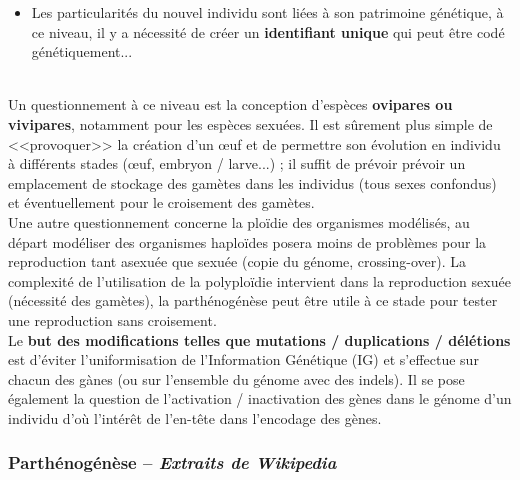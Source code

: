 \documentclass[11pt,twoside,a4paper]{article}
\begin{document}
\begin{itemize}
\begin{itemize}
		\end{itemize}
		Le croisement des g{\'e}nomes des parents s'effectue via l'association des gam{\`e}tes cr{\'e}{\'e}s (choix al{\'e}atoire des g{\`e}nes, crossing-over si polyplo{\"\i}die) quelques modifications peuvent intervenir (mutation, duplication, d{\'e}l{\'e}tion).
	\item Les particularit{\'e}s du nouvel individu sont li{\'e}es {\`a} son patrimoine g{\'e}n{\'e}tique, {\`a} ce niveau, il y a n{\'e}cessit{\'e} de cr{\'e}er un \textbf{identifiant unique} qui peut {\^e}tre cod{\'e} g{\'e}n{\'e}tiquement...
\end{itemize}~\\

Un questionnement {\`a} ce niveau est la conception d'esp{\`e}ces \textbf{ovipares ou vivipares}, notamment pour les esp{\`e}ces sexu{\'e}es. Il est s{\^u}rement plus simple de <<provoquer>> la cr{\'e}ation d'un \oe uf et de permettre son {\'e}volution en individu {\`a} diff{\'e}rents stades (\oe uf, embryon / larve...) ; il suffit de pr{\'e}voir pr{\'e}voir un emplacement de stockage des gam{\`e}tes dans les individus (tous sexes confondus) et {\'e}ventuellement pour le croisement des gam{\`e}tes.~\\

Une autre questionnement concerne la plo{\"i}die des organismes mod{\'e}lis{\'e}s, au d{\'e}part mod{\'e}liser des organismes haplo{\"i}des posera moins de probl{\`e}mes pour la reproduction tant asexu{\'e}e que sexu{\'e}e (copie du g{\'e}nome, crossing-over).  La complexit{\'e} de l'utilisation de la polyplo{\"i}die intervient dans la reproduction sexu{\'e}e (n{\'e}cessit{\'e} des gam{\`e}tes), la parth{\'e}nog{\'e}n{\`e}se peut {\^e}tre utile {\`a} ce stade pour tester une reproduction sans croisement.~\\

Le \textbf{but des modifications telles que mutations / duplications / d{\'e}l{\'e}tions} est d'{\'e}viter l'uniformisation de l'Information G{\'e}n{\'e}tique (IG) et s'effectue sur chacun des g{\`a}nes (ou sur l'ensemble du g{\'e}nome avec des indels). Il se pose {\'e}galement la question de l'activation / inactivation des g{\`e}nes dans le g{\'e}nome d'un individu d'o{\`u} l'int{\'e}r{\^e}t de l'en-t{\^e}te dans l'encodage des g{\`e}nes.~\\


\subsubsection{Parth{\'e}nog{\'e}n{\`e}se -- \emph{Extraits de Wikipedia}~\cite{WikiPathenoGenese}}
\end{document}
